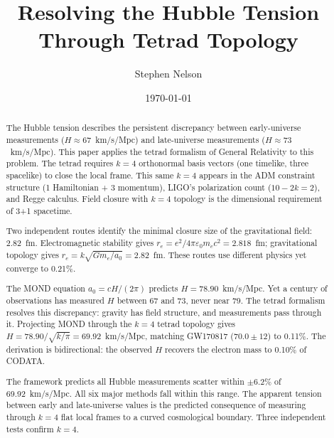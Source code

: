 \documentclass[aps,prd,preprint,superscriptaddress,showpacs,preprintnumbers,amsmath,amssymb,nofootinbib]{revtex4-2}
\begin{document}
\raggedbottom  %

\title{Resolving the Hubble Tension Through Tetrad Topology}

\author{Stephen Nelson}

\date{\today}

\begin{abstract}
The Hubble tension describes the persistent discrepancy between early-universe measurements ($H \approx 67$~km/s/Mpc) and late-universe measurements ($H \approx 73$~km/s/Mpc). This paper applies the tetrad formalism of General Relativity to this problem. The tetrad requires $k=4$ orthonormal basis vectors (one timelike, three spacelike) to close the local frame. This same $k=4$ appears in the ADM constraint structure (1 Hamiltonian + 3 momentum), LIGO's polarization count ($10 - 2k = 2$), and Regge calculus. Field closure with $k=4$ topology is the dimensional requirement of 3+1 spacetime.

Two independent routes identify the minimal closure size of the gravitational field: 2.82~fm. Electromagnetic stability gives $r_e = e^2/4\pi\varepsilon_0 m_e c^2 = 2.818$~fm; gravitational topology gives $r_e = k\sqrt{Gm_e/a_0} = 2.82$~fm. These routes use different physics yet converge to 0.21\%.

The MOND equation $a_0 = cH/(2\pi)$ predicts $H = 78.90$~km/s/Mpc. Yet a century of observations has measured $H$ between 67 and 73, never near 79. The tetrad formalism resolves this discrepancy: gravity has field structure, and measurements pass through it. Projecting MOND through the $k=4$ tetrad topology gives $H = 78.90/\sqrt{k/\pi} = 69.92$~km/s/Mpc, matching GW170817 ($70.0 \pm 12$) to 0.11\%. The derivation is bidirectional: the observed $H$ recovers the electron mass to 0.10\% of CODATA.

The framework predicts all Hubble measurements scatter within $\pm 6.2\%$ of 69.92~km/s/Mpc. All six major methods fall within this range. The apparent tension between early and late-universe values is the predicted consequence of measuring through $k=4$ flat local frames to a curved cosmological boundary. Three independent tests confirm $k=4$.
\end{abstract}
\end{document}
